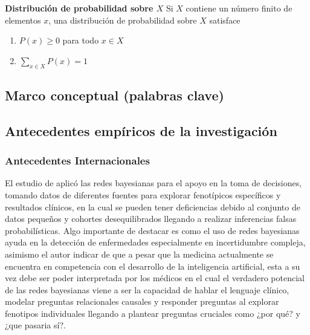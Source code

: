 \begin{defi}
    \textbf{Distribución de probabilidad sobre $X$} \cite{koski2011bayesian}
    Si $X$ contiene un número finito de elementos $x$, una distribución de probabilidad sobre $X$ satisface
    \begin{enumerate}
        \item $P(x) \geq 0$ para todo $x \in X$
        \item $\sum\limits_{x \in X}^{}P(x) = 1$
    \end{enumerate}
\end{defi}

\subsection{Marco conceptual (palabras clave)}


\subsection{Antecedentes empíricos de la investigación}
\subsubsection{Antecedentes Internacionales}
El estudio de \cite{waddell2023applying} aplicó las redes bayesianas para el apoyo en la toma de decisiones, tomando datos de diferentes fuentes para explorar fenotípicos específicos y resultados clínicos, en la cual se pueden tener deficiencias debido al conjunto de datos pequeños y cohortes desequilibrados llegando a realizar inferencias falsas probabilísticas. Algo importante de destacar es como el uso de redes bayesianas ayuda en la detección de enfermedades especialmente en incertidumbre compleja, asimismo el autor indicar de que a pesar que la medicina actualmente se encuentra en competencia con el desarrollo de la inteligencia artificial, esta a su vez debe ser poder interpretada por los médicos en el cual el verdadero potencial de las redes bayesianas viene a ser la capacidad de hablar el lenguaje clínico, modelar preguntas relacionales causales y responder preguntas al explorar fenotipos individuales llegando a plantear preguntas cruciales como ¿por qué? y ¿que pasaria sí?. \\

